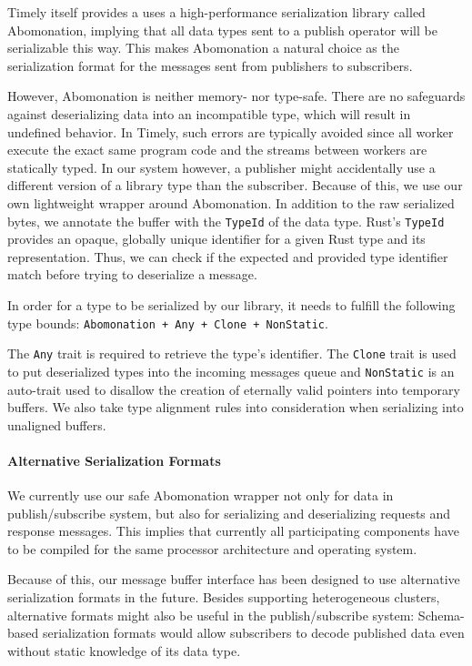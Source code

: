Timely itself provides a uses a high-performance serialization library called
Abomonation, implying that all data types sent to a publish operator will be
serializable this way. This makes Abomonation a natural choice as the serialization
format for the messages sent from publishers to subscribers. 

However, Abomonation is neither memory- nor type-safe. There are no safeguards
against deserializing data into an incompatible type, which will result in undefined
behavior. In Timely, such errors are typically avoided since all worker
execute the exact same program code and the streams between workers are
statically typed. In our system however, a publisher might accidentally use
a different version of a library type than the subscriber. Because of this,
we use our own lightweight wrapper around Abomonation. In addition to the raw
serialized bytes, we annotate the buffer with the \lstinline{TypeId} of the
data type. Rust's \lstinline{TypeId} provides an opaque, globally unique
identifier for a given Rust type and its representation. Thus, we can check
if the expected and provided type identifier match before trying to deserialize
a message.

In order for a type to be serialized by our library, it needs to fulfill the
following type bounds: \lstinline{Abomonation + Any + Clone + NonStatic}.

The \lstinline{Any} trait is required to retrieve the type's identifier. The
\lstinline{Clone} trait is used to put deserialized types into the incoming
messages queue and \lstinline{NonStatic} is an auto-trait used to disallow the
creation of eternally valid pointers into temporary buffers. We also take type
alignment rules into consideration when serializing into unaligned buffers. 

\paragraph{Alternative Serialization Formats}

We currently use our safe Abomonation wrapper not only for data in
publish/subscribe system, but also for serializing and deserializing requests
and response messages. This implies that currently all participating components
have to be compiled for the same processor architecture and operating system.

Because of this, our message buffer interface has been designed to use alternative
serialization formats in the future. Besides supporting heterogeneous clusters,
alternative formats might also be useful in the publish/subscribe system:
Schema-based serialization formats would allow subscribers to decode published
data even without static knowledge of its data type.

